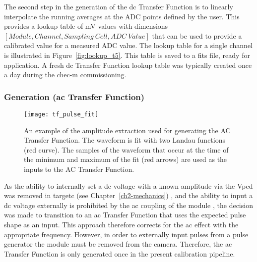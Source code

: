 The second step in the generation of the \gls{dc} Transfer Function is to linearly interpolate the running averages at the ADC points defined by the user. This provides a lookup table of \si{mV} values with dimensions $[Module, Channel, Sampling~Cell, ADC~Value]$ that can be used to provide a calibrated value for a measured ADC value. The lookup table for a single channel is illustrated in Figure~\ref{fig:lookup_t5}. This table is saved to a \gls{fits} file, ready for application. A fresh \gls{dc} Transfer Function lookup table was typically created once a day during the \gls{chec-m} commissioning.

\subsubsection{Generation (\gls{ac} Transfer Function)}

\begin{figure}
	\centering
    \texttt{[image: tf\_pulse\_fit]} 
	\caption[Fit of the waveform in order to extract samples to generate the AC Transfer Function.]{An example of the amplitude extraction used for generating the AC Transfer Function. The waveform is fit with two Landau functions (red curve). The samples of the waveform that occur at the time of the minimum and maximum of the fit (red arrows) are used as the inputs to the AC Transfer Function.} 
	\label{fig:tf_pulse_fit}
\end{figure}

As the ability to internally set a \gls{dc} voltage with a known amplitude via the Vped was removed in \gls{targetc} (see Chapter~\ref{ch2-mechanics}) , and the ability to input a \gls{dc} voltage externally is prohibited by the \gls{ac} coupling of the module , the decision was made to transition to an \gls{ac} Transfer Function that uses the expected pulse shape as an input. This approach therefore corrects for the \gls{ac} effect with the appropriate frequency. However, in order to externally input pulses from a pulse generator the module must be removed from the camera. Therefore, the \gls{ac} Transfer Function is only generated once in the present calibration pipeline.
	
